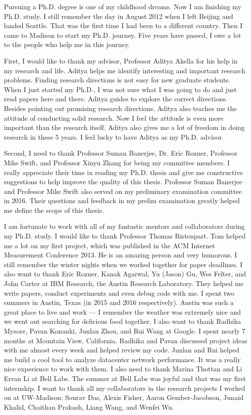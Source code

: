 

Pursuing a Ph.D. degree is one of my childhood dreams. 
Now I am finishing my Ph.D. study. I still remember the day in August 2012 when I left 
Beijing and landed Seattle. That was the first time I had been to 
a different country. Then I came to Madison to start my Ph.D. journey. 
Five years have passed, I owe a lot to the people who help me in this journey. 

First, I would like to thank my advisor, Professor Aditya Akella for 
his help in my research and life. Aditya helps me identify interesting and 
important research problems. Finding research directions is not easy for new 
graduate students. When I just started my Ph.D., I was not sure what I was going to do 
and just read papers here and there. Aditya guides to explore the correct directions. 
Besides pointing out promising research directions, Aditya also teaches me the 
attitude of conducting solid research. Now I feel the attitude is even more 
important than the research itself. Aditya also gives me a lot of freedom in doing 
research in these 5 years. I feel lucky to have Aditya as my Ph.D. advisor.

Second, I need to thank Professor Suman Banerjee, Dr. Eric Rozner, 
Professor Mike Swift, and Professor Xinyu Zhang for being my committee members. 
I really appreciate their time in reading my Ph.D. thesis and give me constructive 
suggestions to help improve the quality of this thesis. Professor Suman Banerjee 
and Professor Mike Swift also served on my preliminary examination committee in 2016. 
Their questions and feedback in my prelim examination greatly helped me 
define the scope of this thesis.

I am fortunate to work with all of my fantastic mentors and collaborators during my Ph.D. study. 
I would like to thank Professor Thomas Ristenpart. Tom helped me a lot on my first project, 
which was published in the ACM Internet Measurement Conference 2013. He is an amazing 
person and very humorous. I still remember the winter nights when we worked together for 
paper deadlines. 
I also want to thank Eric Rozner, Kanak Agarwal, Yu (Jason) Gu, Wes Felter, and 
John Carter at IBM Research, the Austin Research Laboratory. They helped me write papers, 
conduct experiments and even debug code with me. I spent two summers in Austin, Texas 
(in 2015 and 2016 respectively). Austin was such a great place to live and work --- I 
remember the weather was extremely nice and we went out searching for delicious food 
together. I also want to thank Radhika Mysore, Pavan Konanki, Junlan Zhou, and Rui Wang 
at Google. I spent nearly 7 months at Mountain View, California. Radhika and Pavan 
discussed project ideas with me almost every week and helped review my code. 
Junlan and Rui helped me build a cool tool to analyze datacenter network performance. 
It was a really nice experience to work with them. I also need to thank Marina 
Thottan and Li Erran Li at Bell Labs. The summer at Bell Labs was joyful and that 
was my first internship. I want to thank all my collaborators in the research projects 
I worked on at UW-Madison: Sourav Das, Alexis Fisher, Aaron Gember-Jacobson, 
Junaid Khalid, Chaithan Prakash, Liang Wang, and Wenfei Wu. 


